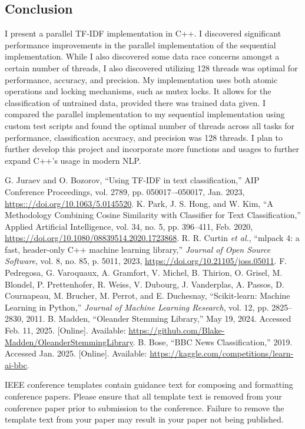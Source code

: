 \documentclass[conference]{IEEEtran}
\begin{document}
\subsection{Conclusion}
I present a parallel TF-IDF implementation in C++. I discovered significant performance improvements in the parallel implementation of the sequential implementation. While I also discovered some data race concerns amongst a certain number of threads, I also discovered utilizing 128 threads was optimal for performance, accuracy, and precision. My implementation uses both atomic operations and locking mechanisms, such as mutex locks. It allows for the classification of untrained data, provided there was trained data given. I compared the parallel implementation to my sequential implementation using custom test scripts and found the optimal number of threads across all tasks for performance, classification accuracy, and precision was 128 threads. I plan to further develop this project and incorporate more functions and usages to further expand C++’s usage in modern NLP.

\begin{thebibliography}{00}
 G. Juraev and O. Bozorov, ``Using TF-IDF in text classification,'' AIP Conference Proceedings, vol. 2789, pp. 050017–-050017, Jan. 2023, \url{https:://doi.org/10.1063/5.0145520}.
 K. Park, J. S. Hong, and W. Kim, ``A Methodology Combining Cosine Similarity with Classifier for Text Classification,'' Applied Artificial Intelligence, vol. 34, no. 5, pp. 396--411, Feb. 2020, \url{https://doi.org/10.1080/08839514.2020.1723868}.
 R. R. Curtin \textit{et al.}, ``mlpack 4: a fast, header-only C++ machine learning library,'' \textit{Journal of Open Source Software}, vol. 8, no. 85, p. 5011, 2023, \url{https://doi.org/10.21105/joss.05011}.
 F. Pedregosa, G. Varoquaux, A. Gramfort, V. Michel, B. Thirion, O. Grisel, M. Blondel, P. Prettenhofer, R. Weiss, V. Dubourg, J. Vanderplas, A. Passos, D. Cournapeau, M. Brucher, M. Perrot, and E. Duchesnay, ``Scikit-learn: Machine Learning in Python,'' \textit{Journal of Machine Learning Research}, vol. 12, pp. 2825--2830, 2011.
 B. Madden, ``Oleander Stemming Library,'' May 19, 2024. Accessed Feb. 11, 2025. [Online]. Available: \url{https://github.com/Blake-Madden/OleanderStemmingLibrary}.
B. Bose, ``BBC News Classification,'' 2019. Accessed Jan. 2025. [Online]. Available: \url{https://kaggle.com/competitions/learn-ai-bbc}.
\end{thebibliography}
\vspace{12pt}
\color{red}
IEEE conference templates contain guidance text for composing and formatting conference papers. Please ensure that all template text is removed from your conference paper prior to submission to the conference. Failure to remove the template text from your paper may result in your paper not being published.
\end{document}
